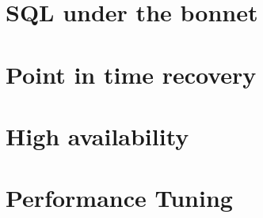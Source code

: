 \documentclass[oneside]{book}
\begin{document}
\tableofcontents{}





\chapter{SQL under the bonnet}
\chapter{Point in time recovery}
\chapter{High availability}
\chapter{Performance Tuning}

\appendix

\listoffigures
\listoftables
\printindex{}
\end{document}
